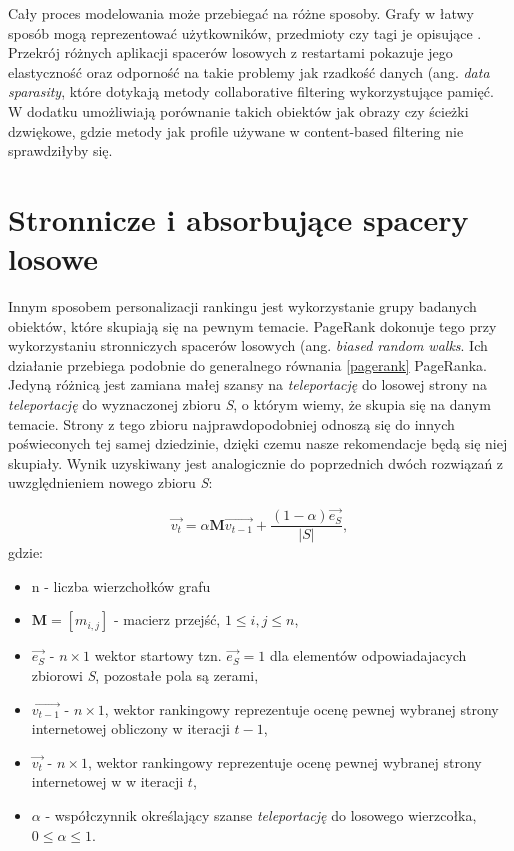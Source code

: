 Cały proces modelowania może przebiegać na różne sposoby. Grafy w łatwy sposób mogą reprezentować użytkowników, przedmioty czy tagi je opisujące \cite{RecommenderASurvey}. Przekrój różnych aplikacji spacerów losowych z restartami pokazuje jego elastyczność oraz odporność na takie problemy jak rzadkość danych (ang. \textit{data sparasity}, które dotykają metody collaborative filtering wykorzystujące pamięć. W dodatku umożliwiają porównanie takich obiektów jak obrazy czy ścieżki dzwiękowe, gdzie metody jak profile używane w content-based filtering nie sprawdziłyby się.


\section{Stronnicze i absorbujące spacery losowe}
\label{chap:abs}

Innym sposobem personalizacji rankingu jest wykorzystanie grupy badanych obiektów, które skupiają się na pewnym temacie. PageRank dokonuje tego przy wykorzystaniu stronniczych spacerów losowych (ang. \textit{biased random walks}. Ich działanie przebiega podobnie do generalnego równania \ref{pagerank} PageRanka. Jedyną różnicą jest zamiana małej szansy na \textit{teleportację} do losowej strony na \textit{teleportację} do wyznaczonej zbioru \textit{S}, o którym wiemy, że skupia się na danym temacie. Strony z tego zbioru najprawdopodobniej odnoszą się do innych poświeconych tej samej dziedzinie, dzięki czemu nasze rekomendacje będą się niej skupiały. Wynik uzyskiwany jest analogicznie do poprzednich dwóch rozwiązań z uwzględnieniem nowego zbioru \textit{S}:

\begin{equation}
\label{rwr}
   \overrightarrow{v_{t}} = \alpha \textbf{M}\overrightarrow{v_{t-1}} +\frac{(1 - \alpha) \overrightarrow{e_{\textit{S}}}}{|S|} ,
\end{equation}
gdzie:
\begin{itemize}
    \item n - liczba wierzchołków grafu
    \item $\bm{M}=[m_{i,j}] $  - macierz przejść, $1 \leq i, j \leq n$,
    \item $\overrightarrow{e_{\textit{S}}}$ - $n \times 1$ wektor startowy tzn. $\overrightarrow{e_{\textit{S}}}=1$ dla elementów odpowiadajacych zbiorowi \textit{S}, pozostałe pola są zerami,
    \item $ \overrightarrow{v_{t-1}}$ - $n \times 1$, wektor rankingowy reprezentuje ocenę pewnej wybranej strony internetowej obliczony w iteracji $t-1$,
    \item $ \overrightarrow{v_{t}}$ - $n \times 1$, wektor rankingowy reprezentuje ocenę pewnej wybranej strony internetowej w  w iteracji $t$,
    \item $\alpha$ - współczynnik określający szanse \textit{teleportację} do losowego wierzcołka, $0 \leq \alpha \leq 1$.
\end{itemize}

